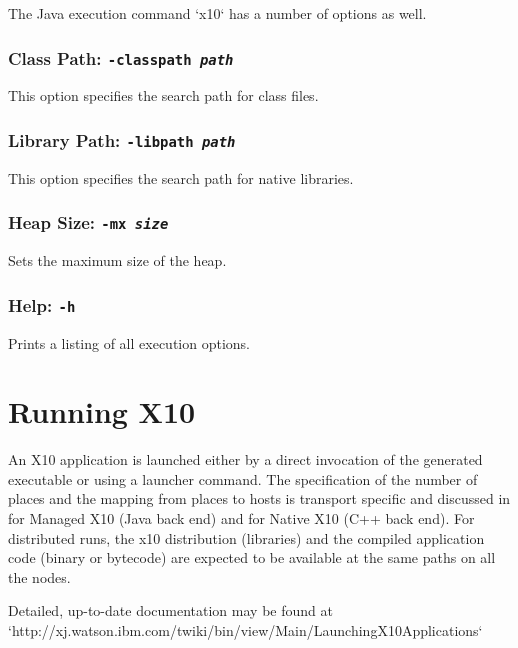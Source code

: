 The Java execution command \xcd`x10` has a number of options as well. 

\subsection{Class Path: {\tt -classpath {\em path}}}

This option specifies the search path for class files. 

\subsection{Library Path: {\tt -libpath {\em path}}}

This option specifies the search path for native libraries.

\subsection{Heap Size: {\tt -mx {\em size}}}

Sets the maximum size of the heap. 

\subsection{Help: {\tt -h}}

Prints a listing of all execution options.





\chapter{Running X10}

An X10 application is launched either by a direct invocation of the generated
executable or using a launcher command. The specification of the number of
places and the mapping from places to hosts is transport specific and
discussed in  for Managed X10 (Java back end) and
 for Native X10 (C++ back end). For distributed runs,
the x10 distribution (libraries) and the compiled application code (binary or
bytecode) are expected to be available at the same paths on all the nodes.  

Detailed, up-to-date documentation may be found at
\xcd`http://xj.watson.ibm.com/twiki/bin/view/Main/LaunchingX10Applications`


